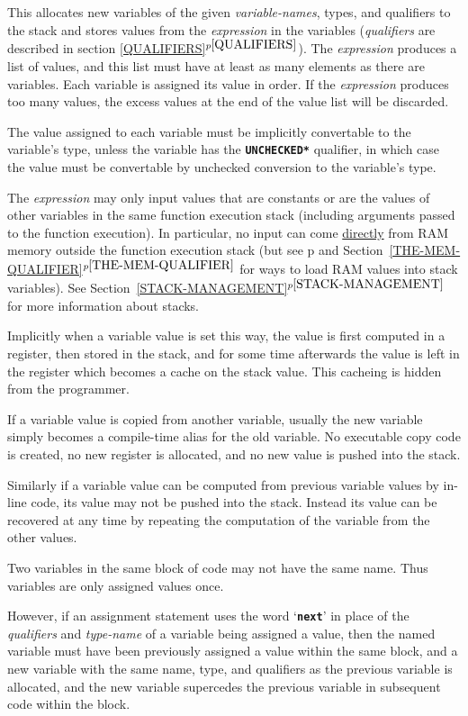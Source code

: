 \documentclass[12pt]{article}
\newcommand{\TT}[1]{{\tt \bfseries #1}}
\newcommand{\itemref}[1]{\ref{#1}$^{p\pageref{#1}}$}
\newcommand{\pagref}[1]{p\pageref{#1}}
\begin{document}
This allocates new variables of the given {\em variable-names}, types,
and qualifiers
to the stack and stores values from the {\em expression} in the variables
({\em qualifiers} are described in section \itemref{QUALIFIERS}).
The {\em expression} produces a list of values, and this list must have
at least as many elements as there are variables.  Each variable is
assigned its value in order.  If the {\em expression} produces
too many values, the excess values at the end of the value list will be
discarded.

The value assigned to each variable
must be implicitly convertable to the variable's type, unless
the variable has the \TT{*UNCHECKED*} qualifier, in which case
the value must be convertable by unchecked conversion to the
variable's type.

The {\em expression} may only input values that are constants or are
the values of other variables in the same function execution
stack (including
arguments passed to the function execution).  In particular,
no input can come \underline{directly}
from RAM memory outside the function execution stack
(but see \pagref{MEM} and Section~\itemref{THE-MEM-QUALIFIER}
for ways to load RAM values into stack variables).
See Section~\itemref{STACK-MANAGEMENT} for more information about stacks.

Implicitly when a variable value is set this way, the value is first
computed in a register, then stored in the stack, and for some time
afterwards the value is left in the register which becomes a cache
on the stack value.  This cacheing is hidden from the programmer.

If a variable value is copied from another variable, usually the
new variable simply becomes a compile-time alias for the old variable.
No executable copy code is created, no new register is allocated, and no new
value is pushed into the stack.

Similarly if a variable value can be computed from previous variable
values by in-line code, 
its value may not be pushed into the stack.  Instead its
value can be recovered at any time by repeating the computation
of the variable from the other values.

Two variables in the same block of code may not have the same
name.  Thus variables are only assigned values once.

However, if an assignment statement uses the word `\TT{next}' in
place of the {\em qualifiers} and {\em type-name}
of a variable being assigned a value, then the named variable must
have been previously assigned a value within the same block,
and a new variable with the same
name, type, and qualifiers as the previous variable is allocated,
and the new variable supercedes the previous variable in subsequent code within
the block.
\end{document}
